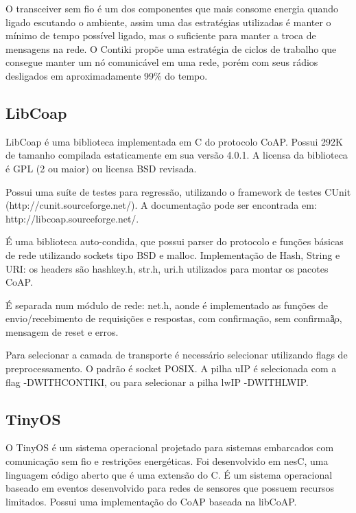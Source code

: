 O transceiver sem fio \'e um dos componentes que mais consome energia quando ligado escutando o ambiente, assim uma das estrat\'egias utilizadas \'e manter o m\'inimo de tempo poss\'ivel ligado, mas o suficiente para manter a troca de mensagens na rede. O Contiki prop\~oe uma estrat\'egia de ciclos de trabalho que consegue manter um n\'o comunic\'avel em uma rede, por\'em com seus r\'adios desligados em aproximadamente 99\% do tempo.

\subsection{LibCoap}
LibCoap \'e uma biblioteca implementada em C do protocolo CoAP. Possui 292K de tamanho compilada estaticamente em sua vers\~ao 4.0.1.
A licensa da biblioteca \'e GPL (2 ou maior) ou licensa BSD revisada.

Possui uma su\'ite de testes para regress\~ao, utilizando o framework de testes CUnit (http://cunit.sourceforge.net/). A documenta\c{c}\~ao pode ser encontrada em: http://libcoap.sourceforge.net/.

\'E uma biblioteca auto-condida, que possui parser do protocolo e fun\c{c}\~oes b\'asicas de rede utilizando sockets tipo BSD e malloc. Implementa\c{c}\~ao de Hash, String e URI: os headers s\~ao hashkey.h, str.h, uri.h utilizados para montar os pacotes CoAP.

\'E separada num m\'odulo de rede: net.h, aonde \'e implementado as fun\c{c}\~oes de envio/recebimento de requisi\c{c}\~oes e respostas, com confirma\c{c}\~ao, sem confirma\c\~ao, mensagem de reset e erros.

Para selecionar a camada de transporte \'e necess\'ario selecionar utilizando flags de preprocessamento. O padr\~ao \'e socket POSIX. A pilha uIP \'e selecionada com a flag -DWITH\textunderscore CONTIKI, ou para selecionar a pilha lwIP -DWITH\textunderscore LWIP.

\subsection{TinyOS}
O TinyOS \'e um sistema operacional projetado para sistemas embarcados com comunica\c{c}\~ao sem fio e restri\c{c}\~oes energ\'eticas. Foi desenvolvido em nesC, uma linguagem c\'odigo aberto que \'e uma extens\~ao do C. \'E um sistema operacional baseado em eventos desenvolvido para redes de sensores que possuem recursos limitados. Possui uma implementa\c{c}\~ao do CoAP baseada na libCoAP.

